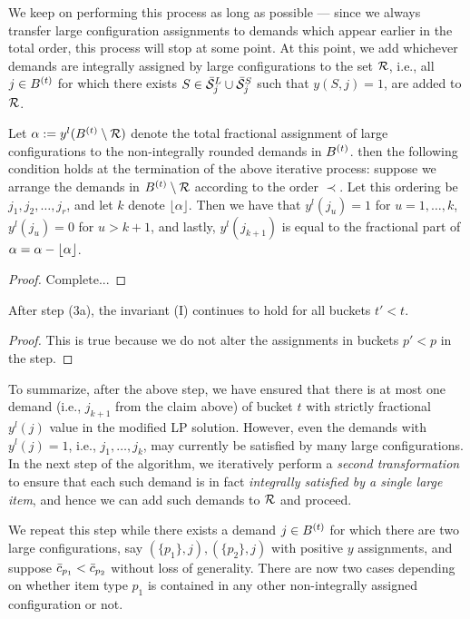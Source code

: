 We keep on performing this process as long as possible --- since we always transfer large configuration assignments to demands which appear earlier in the total order, this process will stop at some point. At this point, we add whichever demands are integrally assigned by large configurations to the set ${\cal R}$, i.e., all $j \in B^{(t)}$ for which there exists $S \in \bar{\cal S}^L_j \cup \bar{\cal S}^S_j$ such that $y(S,j) = 1$, are added to ${\cal R}$.

\begin{claim} \label{cl:step3a}
 Let $\alpha := y^l(B^{(t)} \setminus {\cal R})$ denote the total fractional assignment of large configurations to the non-integrally rounded demands in $B^{(t)}$. then the following condition holds at the termination of the above iterative process: suppose we arrange the demands in $B^{(t)} \setminus {\cal R}$ according to the order $\prec$. Let this ordering be $j_1, j_2, \ldots, j_r$, and let $k$ denote $\lfloor \alpha \rfloor$. Then we have that $y^l(j_u) = 1$ for $u=1, \ldots, k$, $y^l(j_u) = 0$ for $u > k+1$, and lastly, $y^l(j_{k+1})$ is equal to the fractional part of $\alpha = \alpha - \lfloor\alpha\rfloor$.
 \end{claim}

 \begin{proof}
 Complete...
 \end{proof}

\begin{claim}
After step (3a), the invariant (I) continues to hold for all buckets $t' < t$.
\end{claim}

\begin{proof}
This is true because we do not alter the assignments in buckets $p' < p$ in the step.
\end{proof}


To summarize, after the above step, we have ensured that there is at most one demand (i.e., $j_{k+1}$ from the claim above) of bucket $t$
with strictly fractional $y^l(j)$ value in the modified LP solution. However, even the demands with $y^l(j) = 1$, i.e.,  $j_1, \ldots, j_k$,  may currently be satisfied by many large configurations. In the next step of the algorithm, we iteratively perform a \emph{second transformation} to ensure that each such demand is in fact \emph{integrally satisfied by a single large item}, and hence we can add such demands to ${\cal R}$ and proceed.



\medskip {}
We repeat this step while there  exists a  demand $j \in B^{(t)}$ for which there are two large configurations, say $(\{p_1\}, j), (\{p_2\}, j)$ with positive $y$ assignments, and suppose ${\bar c}_{p_1} < {\bar c}_{p_2}$ without loss of generality. There are now two cases depending on whether item type $p_1$ is contained in any other non-integrally assigned configuration or not.

